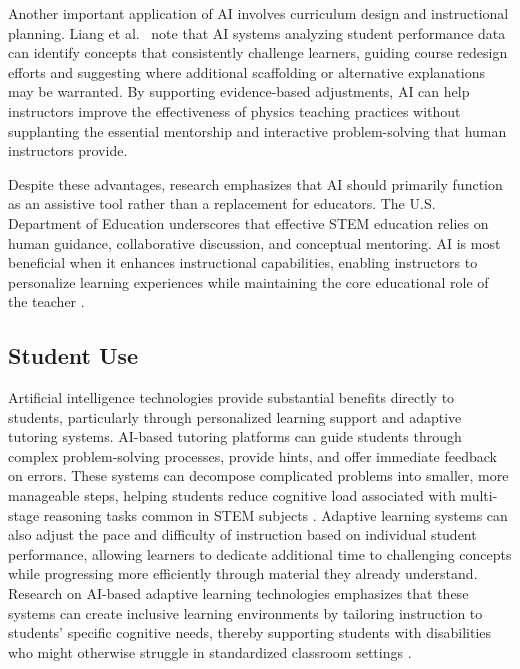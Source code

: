\documentclass[]{aastex701}
\begin{document}
Another important application of AI involves curriculum design and instructional planning. Liang et al.\ \autocite{Liang2026} note that AI systems analyzing student performance data can identify concepts that consistently challenge learners, guiding course redesign efforts and suggesting where additional scaffolding or alternative explanations may be warranted. By supporting evidence-based adjustments, AI can help instructors improve the effectiveness of physics teaching practices without supplanting the essential mentorship and interactive problem-solving that human instructors provide.

Despite these advantages, research emphasizes that AI should primarily function as an assistive tool rather than a replacement for educators. The U.S. Department of Education \autocite{USDOE2023} underscores that effective STEM education relies on human guidance, collaborative discussion, and conceptual mentoring. AI is most beneficial when it enhances instructional capabilities, enabling instructors to personalize learning experiences while maintaining the core educational role of the teacher \autocite{USDOE2023, Sakowicz2025}.


\subsection{Student Use}

Artificial intelligence technologies provide substantial benefits directly to students, particularly through personalized learning support and adaptive tutoring systems. AI-based tutoring platforms can guide students through complex problem-solving processes, provide hints, and offer immediate feedback on errors. These systems can decompose complicated problems into smaller, more manageable steps, helping students reduce cognitive load associated with multi-stage reasoning tasks common in STEM subjects \autocite{Paglialunga2025, Khowaja2025}. Adaptive learning systems can also adjust the pace and difficulty of instruction based on individual student performance, allowing learners to dedicate additional time to challenging concepts while progressing more efficiently through material they already understand. Research on AI-based adaptive learning technologies emphasizes that these systems can create inclusive learning environments by tailoring instruction to students' specific cognitive needs, thereby supporting students with disabilities who might otherwise struggle in standardized classroom settings \autocite{Paglialunga2025, Khowaja2025}.
\end{document}
